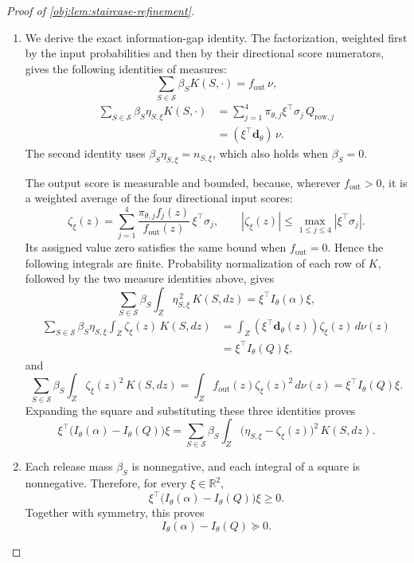 \documentclass[11pt]{article}
\begin{document}
\begin{proof}[Proof of \cref{obj:lem:staircase-refinement}]
\begin{enumerate}
\item
We derive the exact information-gap identity. The factorization, weighted first by the input probabilities and then by their directional score numerators, gives the following identities of measures:
\[
\sum_{S\in\mathcal S}\beta_S K(S,\cdot)
=f_{\mathrm{out}}\,\nu,
\]
\[
\begin{aligned}
\sum_{S\in\mathcal S}\beta_S\eta_{S,\xi}K(S,\cdot)
&=\sum_{j=1}^{4}
  \pi_{\theta,j}\xi^\top\sigma_j\,Q_{\mathrm{row},j}\\
&=(\xi^\top\mathbf d_\theta)\,\nu.
\end{aligned}
\]
The second identity uses \(\beta_S\eta_{S,\xi}=n_{S,\xi}\), which also holds when \(\beta_S=0\).

The output score is measurable and bounded, because, wherever \(f_{\mathrm{out}}>0\), it is a weighted average of the four directional input scores:
\[
\zeta_\xi(z)
=
\sum_{j=1}^{4}
\frac{\pi_{\theta,j}f_j(z)}{f_{\mathrm{out}}(z)}
\,\xi^\top\sigma_j,
\qquad
|\zeta_\xi(z)|
\le\max_{1\le j\le4}|\xi^\top\sigma_j|.
\]
Its assigned value zero satisfies the same bound when \(f_{\mathrm{out}}=0\). Hence the following integrals are finite. Probability normalization of each row of \(K\), followed by the two measure identities above, gives
\[
\sum_{S\in\mathcal S}\beta_S
\int_Z\eta_{S,\xi}^{\,2}\,K(S,dz)
=\xi^\top I_\theta(\alpha)\xi,
\]
\[
\begin{aligned}
\sum_{S\in\mathcal S}\beta_S\eta_{S,\xi}
\int_Z\zeta_\xi(z)\,K(S,dz)
&=\int_Z(\xi^\top\mathbf d_\theta(z))\zeta_\xi(z)\,d\nu(z)\\
&=\xi^\top I_\theta(Q)\xi,
\end{aligned}
\]
and
\[
\sum_{S\in\mathcal S}\beta_S
\int_Z\zeta_\xi(z)^2\,K(S,dz)
=
\int_Z f_{\mathrm{out}}(z)\zeta_\xi(z)^2\,d\nu(z)
=\xi^\top I_\theta(Q)\xi.
\]
Expanding the square and substituting these three identities proves
\[
\xi^\top\bigl(I_\theta(\alpha)-I_\theta(Q)\bigr)\xi
=
\sum_{S\in\mathcal S}\beta_S
\int_Z\bigl(\eta_{S,\xi}-\zeta_\xi(z)\bigr)^2\,K(S,dz).
\]

\item
Each release mass \(\beta_S\) is nonnegative, and each integral of a square is nonnegative. Therefore, for every \(\xi\in\mathbb R^2\),
\[
\xi^\top\bigl(I_\theta(\alpha)-I_\theta(Q)\bigr)\xi\ge0.
\]
Together with symmetry, this proves
\[
I_\theta(\alpha)-I_\theta(Q)\succeq0.
\]


\end{enumerate}
\end{proof}
\end{document}
